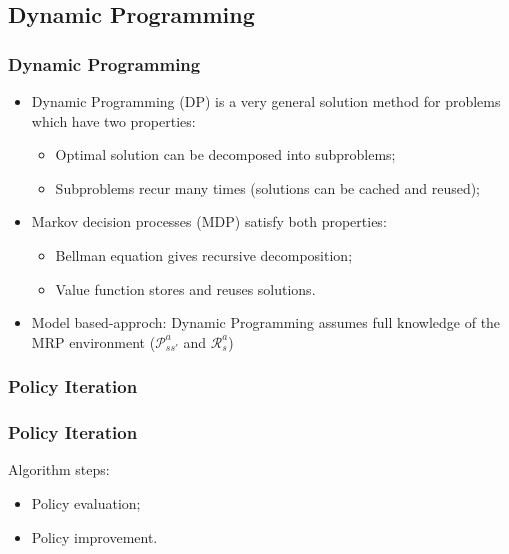 \subsection{Dynamic Programming}
\begin{frame}
    \frametitle{Dynamic Programming}

    \begin{itemize}
        \item Dynamic Programming (DP) is a very general solution method for
        problems which have two properties:

        \begin{itemize}
            \item Optimal solution can be decomposed into subproblems;
            \item Subproblems recur many times (solutions can be cached and reused);
        \end{itemize}

        \item Markov decision processes (MDP) satisfy both properties:
        \begin{itemize}
            \item Bellman equation gives recursive decomposition;
            \item Value function stores and reuses solutions.
        \end{itemize}

        \item {\color{red}Model based-approch:} Dynamic Programming assumes full 
        knowledge of the MRP environment ($\mathcal{P}_{ss'}^{a}$ and $\mathcal{R}_{s}^{a}$)
    \end{itemize}
\end{frame} 




\subsubsection{Policy Iteration}

\begin{frame}
    \frametitle{Policy Iteration}

    Algorithm steps:
    \begin{itemize}
        \item Policy evaluation;
        \item Policy improvement.
    \end{itemize}

\end{frame} 



